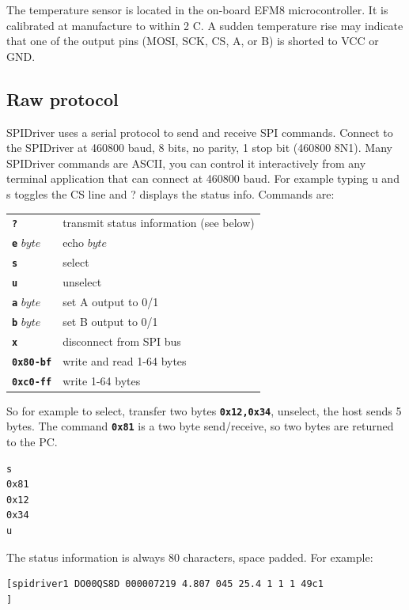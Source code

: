 \documentclass{article}
\newcommand{\mach}[1]{\texttt{\textbf{#1}}}
\newcommand{\gap}{\vspace{10pt}}
\begin{document}
The temperature sensor is located in the on-board EFM8 microcontroller.
It is calibrated at manufacture to within 2 C.
A sudden temperature rise may indicate that one of the output pins (MOSI, SCK, CS, A, or B) is shorted to VCC or GND.

\subsection{Raw protocol}

SPIDriver uses a serial protocol to send and receive SPI commands.
Connect to the SPIDriver at 460800 baud, 8 bits, no parity, 1 stop bit (460800 8N1).
Many SPIDriver commands are ASCII, you can control it
interactively from any terminal application that can connect at 460800
baud. For example typing u and s toggles the CS line and ? displays the
status info.
Commands are:

\gap\begin{tabular}{ll}
\hline
\mach{?}        & transmit status information (see below)        \\
\mach{e} $byte$ & echo $byte$       \\
\mach{s}        & select        \\
\mach{u}        & unselect        \\
\mach{a} $byte$ & set A output to 0/1       \\
\mach{b} $byte$ & set B output to 0/1       \\
\mach{x}        & disconnect from SPI bus       \\
\mach{0x80-bf}  & write and read 1-64 bytes       \\
\mach{0xc0-ff}  & write 1-64 bytes        \\ \hline
\end{tabular}\gap

So for example to select, transfer two bytes
\mach{0x12,0x34},
unselect, the host sends 5 bytes.
The command \mach{0x81} is a two byte send/receive, so two bytes are returned to the PC.

\begin{lstlisting}
s
0x81
0x12
0x34
u
\end{lstlisting}


The status information is always 80 characters, space padded. For example:

{\scriptsize
\begin{framed}\begin{Verbatim}
[spidriver1 DO00QS8D 000007219 4.807 045 25.4 1 1 1 49c1                       ]
\end{Verbatim}
\end{framed}}
\end{document}
